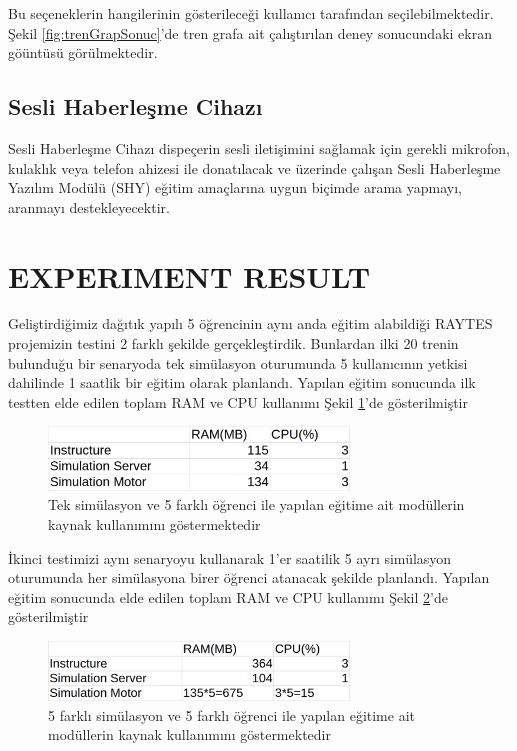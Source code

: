 \documentclass[conference]{IEEEtran}
\begin{document}
Bu seçeneklerin hangilerinin gösterileceği kullanıcı tarafından seçilebilmektedir.
Şekil \ref{fig:trenGrapSonuc}'de tren grafa ait çalıştırılan deney sonucundaki ekran göüntüsü görülmektedir.

\subsection{Sesli Haberleşme Cihazı}

Sesli Haberleşme Cihazı dispeçerin sesli iletişimini sağlamak için gerekli mikrofon, kulaklık veya telefon ahizesi ile donatılacak ve üzerinde çalışan Sesli Haberleşme Yazılım Modülü (SHY) eğitim amaçlarına uygun biçimde arama yapmayı, aranmayı destekleyecektir. 

\section{EXPERIMENT RESULT}
Geliştirdiğimiz dağıtık yapılı 5 öğrencinin aynı anda eğitim alabildiği RAYTES projemizin testini 2 farklı şekilde gerçekleştirdik. Bunlardan ilki 20 trenin bulunduğu bir senaryoda tek simülasyon oturumunda 5 kullanıcının yetkisi dahilinde 1 saatlik bir eğitim olarak planlandı. Yapılan eğitim sonucunda ilk testten elde edilen toplam RAM ve CPU kullanımı Şekil \ref{fig:hepsibir}'de gösterilmiştir


\begin{figure}[h!]
  \centering
  \includegraphics[width=8cm]{hepsibir.png}
  \caption{Tek simülasyon ve 5 farklı öğrenci ile yapılan eğitime ait modüllerin kaynak kullanımını göstermektedir}\label{fig:hepsibir}
  
\end{figure}

İkinci testimizi aynı senaryoyu kullanarak 1'er saatilik 5 ayrı simülasyon oturumunda her simülasyona birer öğrenci atanacak şekilde planlandı. Yapılan eğitim sonucunda elde edilen toplam RAM ve CPU kullanımı Şekil \ref{fig:hepsiayri}'de gösterilmiştir

\begin{figure}[h!]
  \centering
  \includegraphics[width=8cm]{hepsiayri.png}
  \caption{5 farklı simülasyon ve 5 farklı öğrenci ile yapılan eğitime ait modüllerin kaynak kullanımını göstermektedir}\label{fig:hepsiayri}
  
\end{figure}
\end{document}
